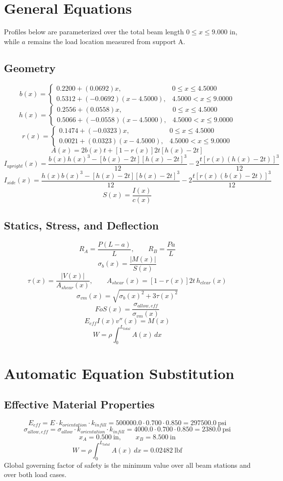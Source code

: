 \documentclass[11pt]{article}
\begin{document}
\section*{General Equations}
Profiles below are parameterized over the total beam length $0 \le x \le 9.000$ in, while $a$ remains the load location measured from support A.
\subsection*{Geometry}
\[
b(x)=\begin{cases}0.2200 + (0.0692)x, & 0 \le x \le 4.5000\\0.5312 + (-0.0692)(x-4.5000), & 4.5000 < x \le 9.0000\end{cases}
\]
\[
h(x)=\begin{cases}0.2556 + (0.0558)x, & 0 \le x \le 4.5000\\0.5066 + (-0.0558)(x-4.5000), & 4.5000 < x \le 9.0000\end{cases}
\]
\[
r(x)=\begin{cases}0.1474 + (-0.0323)x, & 0 \le x \le 4.5000\\0.0021 + (0.0323)(x-4.5000), & 4.5000 < x \le 9.0000\end{cases}
\]
\[
A(x)=2b(x)t+[1-r(x)]2t[h(x)-2t]
\]
\[
I_{upright}(x)=\frac{b(x)h(x)^3-[b(x)-2t][h(x)-2t]^3}{12}-2\frac{t[r(x)(h(x)-2t)]^3}{12}
\]
\[
I_{side}(x)=\frac{h(x)b(x)^3-[h(x)-2t][b(x)-2t]^3}{12}-2\frac{t[r(x)(b(x)-2t)]^3}{12}
\]
\[
S(x)=\frac{I(x)}{c(x)}
\]

\subsection*{Statics, Stress, and Deflection}
\[
R_A=\frac{P(L-a)}{L}, \qquad R_B=\frac{Pa}{L}
\]
\[
\sigma_b(x)=\frac{|M(x)|}{S(x)}
\]
\[
\tau(x)=\frac{|V(x)|}{A_{shear}(x)}, \qquad A_{shear}(x)=[1-r(x)]2t\,h_{clear}(x)
\]
\[
\sigma_{vm}(x)=\sqrt{\sigma_b(x)^2+3\tau(x)^2}
\]
\[
FoS(x)=\frac{\sigma_{allow,eff}}{\sigma_{vm}(x)}
\]
\[
E_{eff}I(x)v''(x)=M(x)
\]
\[
W=\rho\int_0^{L_{total}} A(x)\,dx
\]

\section*{Automatic Equation Substitution}
\subsection*{Effective Material Properties}
\[E_{eff} = E \cdot k_{orientation} \cdot k_{infill} = 500000.0 \cdot 0.700 \cdot 0.850 = 297500.0\ \mathrm{psi}\]
\[\sigma_{allow,eff} = \sigma_{allow} \cdot k_{orientation} \cdot k_{infill} = 4000.0 \cdot 0.700 \cdot 0.850 = 2380.0\ \mathrm{psi}\]
\[x_A = 0.500\ \mathrm{in}, \qquad x_B = 8.500\ \mathrm{in}\]
\[W = \rho \int_0^{L_{total}} A(x)\,dx = 0.02482\ \mathrm{lbf}\]
Global governing factor of safety is the minimum value over all beam stations and over both load cases.
\end{document}
